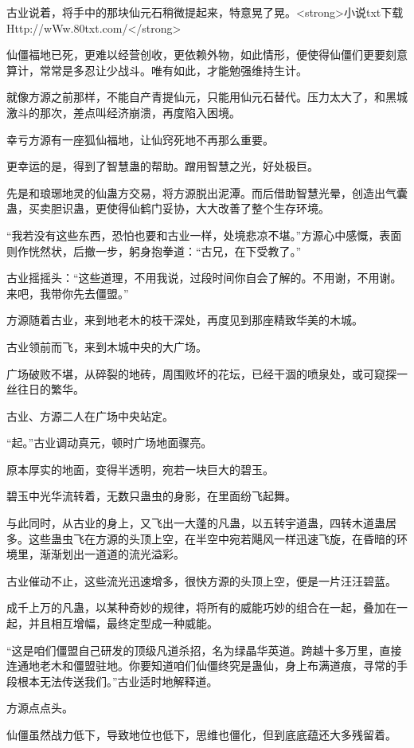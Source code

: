 \begin{this_body}
古业说着，将手中的那块仙元石稍微提起来，特意晃了晃。<strong>小说txt下载Http://wWw.80txt.com/</strong>

仙僵福地已死，更难以经营创收，更依赖外物，如此情形，便使得仙僵们更要刻意算计，常常是多忍让少战斗。唯有如此，才能勉强维持生计。

就像方源之前那样，不能自产青提仙元，只能用仙元石替代。压力太大了，和黑城激斗的那次，差点叫经济崩溃，再度陷入困境。

幸亏方源有一座狐仙福地，让仙窍死地不再那么重要。

更幸运的是，得到了智慧蛊的帮助。蹭用智慧之光，好处极巨。

先是和琅琊地灵的仙蛊方交易，将方源脱出泥潭。而后借助智慧光晕，创造出气囊蛊，买卖胆识蛊，更使得仙鹤门妥协，大大改善了整个生存环境。

“我若没有这些东西，恐怕也要和古业一样，处境悲凉不堪。”方源心中感慨，表面则作恍然状，后撤一步，躬身抱拳道：“古兄，在下受教了。”

古业摇摇头：“这些道理，不用我说，过段时间你自会了解的。不用谢，不用谢。来吧，我带你先去僵盟。”

方源随着古业，来到地老木的枝干深处，再度见到那座精致华美的木城。

古业领前而飞，来到木城中央的大广场。

广场破败不堪，从碎裂的地砖，周围败坏的花坛，已经干涸的喷泉处，或可窥探一丝往日的繁华。

古业、方源二人在广场中央站定。

“起。”古业调动真元，顿时广场地面骤亮。

原本厚实的地面，变得半透明，宛若一块巨大的碧玉。

碧玉中光华流转着，无数只蛊虫的身影，在里面纷飞起舞。

与此同时，从古业的身上，又飞出一大蓬的凡蛊，以五转宇道蛊，四转木道蛊居多。这些蛊虫飞在方源的头顶上空，在半空中宛若飓风一样迅速飞旋，在昏暗的环境里，渐渐划出一道道的流光溢彩。

古业催动不止，这些流光迅速增多，很快方源的头顶上空，便是一片汪汪碧蓝。

成千上万的凡蛊，以某种奇妙的规律，将所有的威能巧妙的组合在一起，叠加在一起，并且相互增幅，最终定型成一种威能。

“这是咱们僵盟自己研发的顶级凡道杀招，名为绿晶华英道。跨越十多万里，直接连通地老木和僵盟驻地。你要知道咱们仙僵终究是蛊仙，身上布满道痕，寻常的手段根本无法传送我们。”古业适时地解释道。

方源点点头。

仙僵虽然战力低下，导致地位也低下，思维也僵化，但到底底蕴还大多残留着。


\end{this_body}
